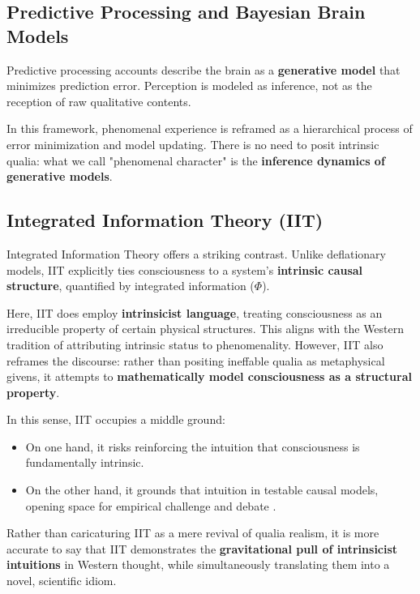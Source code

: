 \documentclass[11pt,a4paper]{article}
\begin{document}
\subsection{Predictive Processing and Bayesian Brain Models}

Predictive processing accounts \cite{clark2013, friston2018} describe the brain as a \textbf{generative model} that minimizes prediction error. Perception is modeled as inference, not as the reception of raw qualitative contents.

In this framework, phenomenal experience is reframed as a hierarchical process of error minimization and model updating. There is no need to posit intrinsic qualia: what we call "phenomenal character" is the \textbf{inference dynamics of generative models}.

\subsection{Integrated Information Theory (IIT)}

Integrated Information Theory \cite{tononi2008, koch2015} offers a striking contrast. Unlike deflationary models, IIT explicitly ties consciousness to a system's \textbf{intrinsic causal structure}, quantified by integrated information ($\Phi$).

Here, IIT does employ \textbf{intrinsicist language}, treating consciousness as an irreducible property of certain physical structures. This aligns with the Western tradition of attributing intrinsic status to phenomenality. However, IIT also reframes the discourse: rather than positing ineffable qualia as metaphysical givens, it attempts to \textbf{mathematically model consciousness as a structural property}.

In this sense, IIT occupies a middle ground:

\begin{itemize}
\item On one hand, it risks reinforcing the intuition that consciousness is fundamentally intrinsic.
\item On the other hand, it grounds that intuition in testable causal models, opening space for empirical challenge and debate \cite{block1995, kriegel2009}.
\end{itemize}

Rather than caricaturing IIT as a mere revival of qualia realism, it is more accurate to say that IIT demonstrates the \textbf{gravitational pull of intrinsicist intuitions} in Western thought, while simultaneously translating them into a novel, scientific idiom.
\end{document}
